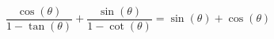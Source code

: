 {$\dfrac{\cos(\theta)}{1 - \tan(\theta)} + \dfrac{\sin(\theta)}{1 - \cot(\theta)} = \sin(\theta) + \cos(\theta)$}
{}
